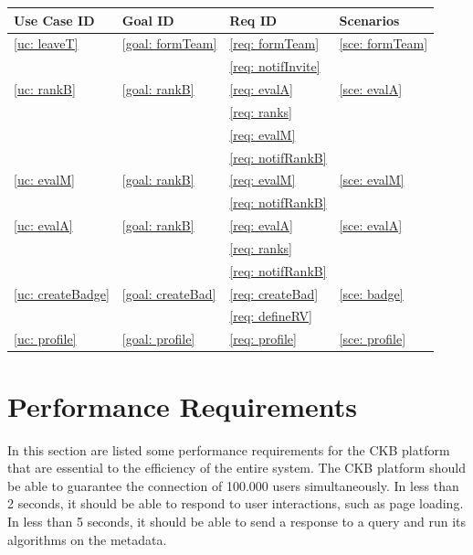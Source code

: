     \clearpage
    \begin{table}[h]
        \centering
        \renewcommand{\arraystretch}{1.5}
        \begin{tabular}{|m{3cm}|m{3cm}|m{3cm}|m{3cm}|}
            \hline
            \textbf{Use Case ID} & \textbf{Goal ID} & \textbf{Req ID} & \textbf{Scenarios} \\
            \hline
            \ref{uc: leaveT} & \ref{goal: formTeam} & \ref{req: formTeam} & \ref{sce: formTeam} \\
                \null & \null  & \ref{req: notifInvite}& \null \\ 
            \hline
            \ref{uc: rankB} & \ref{goal: rankB} & \ref{req: evalA} & \ref{sce: evalA} \\
                \null & \null  & \ref{req: ranks}& \null \\ 
                \null & \null  & \ref{req: evalM}&\null \\
                \null & \null  & \ref{req: notifRankB}&\null \\
            \hline
            \ref{uc: evalM} & \ref{goal: rankB} & \ref{req: evalM} & \ref{sce: evalM} \\
                \null & \null  & \ref{req: notifRankB}&\null \\
            \hline
            \ref{uc: evalA} & \ref{goal: rankB} & \ref{req: evalA} & \ref{sce: evalA} \\
                \null & \null  & \ref{req: ranks}&\null \\
                \null & \null  & \ref{req: notifRankB}&\null \\
            \hline
            \ref{uc: createBadge} & \ref{goal: createBad} & \ref{req: createBad} & \ref{sce: badge} \\
            \null & \null  & \ref{req: defineRV}&\null \\
            \hline
            \ref{uc: profile} & \ref{goal: profile} & \ref{req: profile} & \ref{sce: profile} \\
            \hline
        \end{tabular}
    \end{table}
    
\clearpage
\section{Performance Requirements}
In this section are listed some performance requirements for the CKB platform that are essential to the efficiency of the entire system.
The CKB platform should be able to guarantee the connection of 100.000 users simultaneously. \newline 
In less than 2 seconds, it should be able to respond to user interactions, such as page loading. \newline
In less than 5 seconds, it should be able to send a response to a query and run its algorithms on the metadata. 

